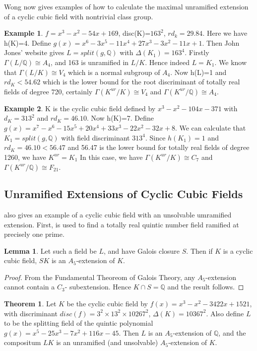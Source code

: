 \documentclass[12pt]{extarticle}
\newcommand{\Q}{\mathbb{Q}}
\newcommand{\<}{\langle}
\renewcommand{\>}{\rangle}
\theoremstyle{definition}
\newtheorem{theorem}{Theorem}
\newtheorem*{example}{Example}
\newtheorem{lemma}{Lemma}
\begin{document}
Wong now gives examples of how to calculate the maximal unramified extension of a cyclic cubic field with nontrivial class group. \begin{example}
    $f=x^3-x^2-54x+169$, disc(K)=$163^2$, $rd_{k}=29.84$. Here we have h(K)=4. Define $g(x)=x^6-3x^5-11x^4+27x^3-3x^2-11x+1$. Then John Jones' website gives $L = split(g,\mathbb{Q})$ with $\Delta(K_1)=163^4$. Firstly $\Gamma(L/\mathbb{Q}) \cong A_4$, and 163 is unramified in $L/K$. Hence indeed $L=K_1$. We know that $\Gamma(L/K)\cong V_4$ which is a normal subgroup of $A_4$. Now h(L)=1 and $rd_K < 54.62$ which is the lower bound for the root discriminant of totally real fields of degree 720, certainly $\Gamma(K^{ur}/K) \cong V_4$ and $\Gamma(K^{ur}/\mathbb{Q}) \cong A_4$. 
\end{example}
\begin{example}
K is the cyclic cubic field defined by $x^3-x^2-104x-371$ with $d_K = 313^2$
and $rd_{K} = 46.10$. Now h(K)=7. Define $g(x) = x^7-x^6-15x^5+20x^4+33x^3-22x^2-32x+8$. We can calculate that $K_1=split(g,\Q)$ with field discriminant $313^4$. Since $h(K_1) = 1$ and $rd_K = 46.10 < 56.47$ and 56.47 is the lower
bound for totally real fields of degree 1260, we have $K^{ur}=K_1$ In this
case, we have $\Gamma(K^{ur}/K) \cong C_7$ and $\Gamma(K^{ur}/\mathbb{Q}) \cong F_{21} $.  
\end{example}
\subsection{Unramified Extensions of Cyclic Cubic Fields}
\cite{WONG} also gives an example of a cyclic cubic field with an unsolvable umramified extension.
First, \cite{JONE2} is used to find a totally real quintic number field ramified at precisely one prime.

\begin{lemma}
 Let such a field be $L$, and have Galois closure $S$. Then if $K$ is a cyclic cubic field, $SK$ is an $A_5$-extension of $K$.
\end{lemma}
\begin{proof}
From the Fundamental Theoreom of Galois Theory, any $A_5$-extension cannot contain a $C_3$- subextension. Hence $K \cap S = \Q$ and the result follows.
\end{proof}
\begin{theorem}
Let $K$ be the cyclic cubic field by $f(x) = x^3 - x^2 - 3422x + 1521$, with discriminant $disc(f) = 3^2 \times 13^2 \times 10267^2$, $\Delta(K) = 10367^2$. Also define $L$ to be the splitting field of the quintic polynomial $g(x) = x^5 - 25x^3 - 7x^2 + 116x - 45$. Then $L$ is an $A_5$-extension of $\Q$, and the compositum $LK$ is an unramified (and unsolvable) $A_5$-extension of $K$.
\end{theorem}
\end{document}
